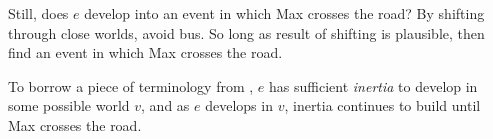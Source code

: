 \begin{note}
  Still, does \(e\) develop into an event in which Max crosses the road?
  By shifting through close worlds, avoid bus.
  So long as result of shifting is plausible, then find an event in which Max crosses the road.

  To borrow a piece of terminology from \textcite{Dowty:1979vq}, \(e\) has sufficient \emph{inertia} to develop in some possible world \(v\), and as \(e\) develops in \(v\), inertia continues to build until Max crosses the road.

\end{note}

